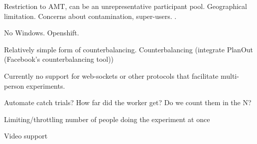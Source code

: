 \documentclass[twocolumn]{svjour3}          %
\begin{document}
Restriction to AMT, can be an unrepresentative participant pool. Geographical limitation. Concerns about contamination, super-users. \cite{chandler2014nonnaivete}.

No Windows. Openshift.

Relatively simple form of counterbalancing.
Counterbalancing (integrate PlanOut (Facebook's counterbalancing tool))

Currently no support for web-sockets or other protocols that facilitate multi-person experiments.

Automate catch trials? How far did the worker get? Do we count them in the N? 

Limiting/throttling number of people doing the experiment at once

Video support





\end{document}
